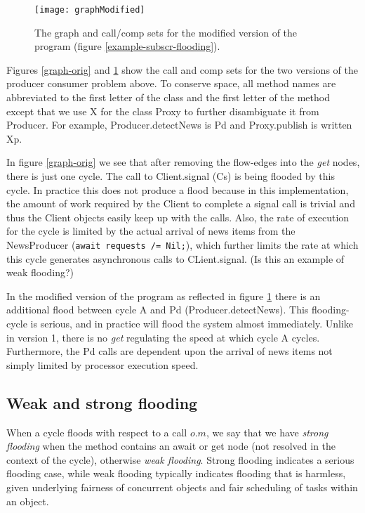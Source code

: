 \documentclass[12pt]{article}%
\begin{document}
\begin{figure}[t]
\texttt{[image: graphModified]}
\caption{\label{graph-modified}
The graph and call/comp sets for the modified version of the program (figure \ref{example-subscr-flooding}).
}
\end{figure}


Figures \ref{graph-orig} and \ref{graph-modified} show the call and comp sets
for the two versions of the producer consumer problem above. To conserve space, all method names are abbreviated to the
first letter of the class and the first letter of the method except that we use X for the class Proxy to further disambiguate it from Producer. 
For example, Producer.detectNews is Pd and Proxy.publish is written Xp.

In figure \ref{graph-orig} we see that after removing the flow-edges into the \emph{get} nodes, there is just one cycle.
The call to Client.signal (Cs) is being flooded by this cycle.
In practice this does not produce a flood because in this implementation, the amount of work required by the
Client to complete a signal call is trivial and thus the Client objects easily keep up with the calls. 
Also, the rate of execution for the cycle is
limited by the actual arrival of news items from the NewsProducer (\lstinline{await requests /= Nil;}), 
which further limits the rate at which this cycle generates asynchronous calls to
CLient.signal. (Is this an example of weak flooding?)

In the modified version of the program as reflected in figure \ref{graph-modified} there is an additional flood between cycle A and
Pd (Producer.detectNews). This flooding-cycle is serious, and in practice will flood the system almost immediately.
Unlike in version 1, there is no \emph{get} regulating the speed at which cycle A cycles. Furthermore, the Pd calls are dependent upon the
arrival of news items not simply limited by processor execution speed.

\subsection{Weak and strong flooding}
When a cycle floods with respect to a call $o.m$,
we say that we have \emph{strong flooding} 
when the method contains an  await or get node
(not resolved in the context of the cycle),
otherwise \emph{weak flooding}.
Strong flooding indicates a serious flooding case,
while weak flooding typically indicates flooding 
that is harmless, given underlying fairness of concurrent objects
and  fair scheduling of tasks within an object. 
\end{document}
